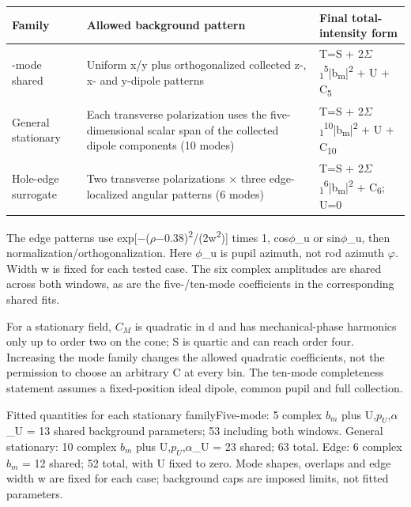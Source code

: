 \documentclass[10pt,a4paper]{article}
\begin{document}
{\footnotesize\setlength{\tabcolsep}{4pt}\begin{tabularx}{\linewidth}{>{\hsize}Y>{\hsize}Y>{\hsize}Y}\toprule{}
\textbf{Family} & \textbf{Allowed background pattern} & \textbf{Final total-intensity form}\\-mode shared & Uniform x/y plus orthogonalized collected z-, x- and y-dipole patterns & T=S + 2\(Σ\)\textsubscript{1}\textsuperscript{5}|b\textsubscript{m}|\textsuperscript{2} + U + C\textsubscript{5}\\
General stationary & Each transverse polarization uses the five-dimensional scalar span of the collected dipole components (10 modes) & T=S + 2\(Σ\)\textsubscript{1}\textsuperscript{10}|b\textsubscript{m}|\textsuperscript{2} + U + C\textsubscript{10}\\
Hole-edge surrogate & Two transverse polarizations \(\times\) three edge-localized angular patterns (6 modes) & T=S + 2\(Σ\)\textsubscript{1}\textsuperscript{6}|b\textsubscript{m}|\textsuperscript{2} + C\textsubscript{6}; U=0\\
\bottomrule\end{tabularx}}\par\medskip
The edge patterns use exp[\(-\)(\(ρ\)\(-\)0.38)\textsuperscript{2}/(2w\textsuperscript{2})] times 1, cos\(ϕ\)\_u or sin\(ϕ\)\_u, then normalization/orthogonalization. Here \(ϕ\)\_u is pupil azimuth, not rod azimuth \(φ\). Width w is fixed for each tested case. The six complex amplitudes are shared across both windows, as are the five-/ten-mode coefficients in the corresponding shared fits.\par
For a stationary field, \(C_{M}\) is quadratic in d and has mechanical-phase harmonics only up to order two on the cone; S is quartic and can reach order four. Increasing the mode family changes the allowed quadratic coefficients, not the permission to choose an arbitrary C at every bin. The ten-mode completeness statement assumes a fixed-position ideal dipole, common pupil and full collection.\par
\begin{fitbox}{Fitted quantities for each stationary family}Five-mode: 5 complex \(b_{m}\) plus U,\(p_{U}\),\(α\)\_U = 13 shared background parameters; 53 including both windows. General stationary: 10 complex \(b_{m}\) plus U,\(p_{U}\),\(α\)\_U = 23 shared; 63 total. Edge: 6 complex \(b_{m}\) = 12 shared; 52 total, with U fixed to zero. Mode shapes, overlaps and edge width w are fixed for each case; background caps are imposed limits, not fitted parameters.\end{fitbox}
\end{document}
